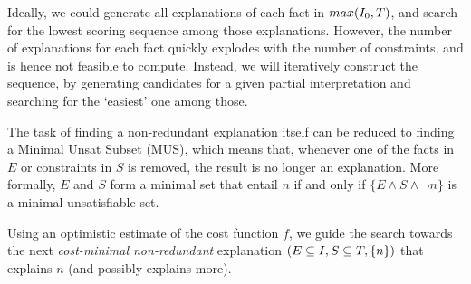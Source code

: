 Ideally, we could generate all explanations of each fact in $max(I_0,T)$, and search for the lowest scoring sequence among those explanations.
However, the number of explanations for each fact quickly explodes with the number of constraints, and is hence not feasible to compute.
Instead, we will iteratively construct the sequence, by generating candidates for a given partial interpretation and searching for the `easiest' one among those.


The task of finding a non-redundant explanation itself can be reduced to finding a Minimal Unsat Subset (MUS), which means that, whenever one of the facts in $E$ or constraints in $S$ is removed, the result is no longer an explanation.
More formally, $E$ and $S$ form a minimal set that entail $n$ if and only if $\{E \land S \land \lnot n\}$ is a minimal unsatisfiable set.

Using an optimistic estimate of the cost function $f$, we guide the search towards the next \emph{cost-minimal non-redundant} explanation $(E \subseteq I, S \subseteq T,\{n\})$ that explains $n$ (and possibly explains more).


